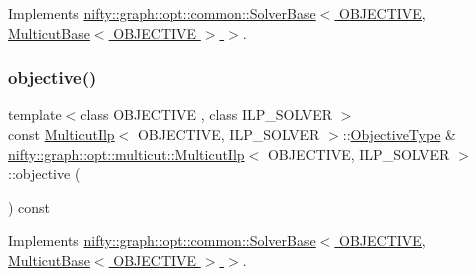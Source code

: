 Implements \hyperlink{classnifty_1_1graph_1_1opt_1_1common_1_1SolverBase_af638b9a804cfec3e35fe87c77e942d30}{nifty\+::graph\+::opt\+::common\+::\+Solver\+Base$<$ O\+B\+J\+E\+C\+T\+I\+V\+E, Multicut\+Base$<$ O\+B\+J\+E\+C\+T\+I\+V\+E $>$ $>$}.

\mbox{\label{classnifty_1_1graph_1_1opt_1_1multicut_1_1MulticutIlp_abe5109360a67abc282f952761f7f9558}} 
\subsubsection{\texorpdfstring{objective()}{objective()}}
{\footnotesize\ttfamily template$<$class O\+B\+J\+E\+C\+T\+I\+VE , class I\+L\+P\+\_\+\+S\+O\+L\+V\+ER $>$ \\
const \hyperlink{classnifty_1_1graph_1_1opt_1_1multicut_1_1MulticutIlp}{Multicut\+Ilp}$<$ O\+B\+J\+E\+C\+T\+I\+VE, I\+L\+P\+\_\+\+S\+O\+L\+V\+ER $>$\+::\hyperlink{classnifty_1_1graph_1_1opt_1_1multicut_1_1MulticutIlp_acd5485d2d20d1e89c5202fc677993d5a}{Objective\+Type} \& \hyperlink{classnifty_1_1graph_1_1opt_1_1multicut_1_1MulticutIlp}{nifty\+::graph\+::opt\+::multicut\+::\+Multicut\+Ilp}$<$ O\+B\+J\+E\+C\+T\+I\+VE, I\+L\+P\+\_\+\+S\+O\+L\+V\+ER $>$\+::objective (\begin{DoxyParamCaption}{ }\end{DoxyParamCaption}) const\hspace{0.3cm}{\ttfamily [virtual]}}



Implements \hyperlink{classnifty_1_1graph_1_1opt_1_1common_1_1SolverBase_a55e9eb645c07d6e0782ebfb990ab3c84}{nifty\+::graph\+::opt\+::common\+::\+Solver\+Base$<$ O\+B\+J\+E\+C\+T\+I\+V\+E, Multicut\+Base$<$ O\+B\+J\+E\+C\+T\+I\+V\+E $>$ $>$}.

\mbox{\label{classnifty_1_1graph_1_1opt_1_1multicut_1_1MulticutIlp_a6178a80dc1ce1729ced4adf6917f676d}} 
